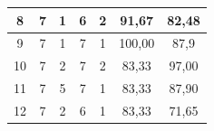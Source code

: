 \begin{table}[H]
\begin{tabular}{|ccccc|c|c|}
		\multicolumn{1}{|c|}{8}                                 & \multicolumn{1}{c|}{7}                                                                          & \multicolumn{1}{c|}{1}                                                                          & \multicolumn{1}{c|}{6}                                                                          & 2                                                  & 91,67                                                & 82,48                                                     \\ \hline
		\multicolumn{1}{|c|}{9}                                 & \multicolumn{1}{c|}{7}                                                                          & \multicolumn{1}{c|}{1}                                                                          & \multicolumn{1}{c|}{7}                                                                          & 1                                                  & 100,00                                               & 87,9                                                      \\ \hline
		\multicolumn{1}{|c|}{10}                                & \multicolumn{1}{c|}{7}                                                                          & \multicolumn{1}{c|}{2}                                                                          & \multicolumn{1}{c|}{7}                                                                          & 2                                                  & 83,33                                                & 97,00                                                     \\ \hline
		\multicolumn{1}{|c|}{11}                                & \multicolumn{1}{c|}{7}                                                                          & \multicolumn{1}{c|}{5}                                                                          & \multicolumn{1}{c|}{7}                                                                          & 1                                                  & 83,33                                                & 87,90                                                     \\ \hline
		\multicolumn{1}{|c|}{12}                                & \multicolumn{1}{c|}{7}                                                                          & \multicolumn{1}{c|}{2}                                                                          & \multicolumn{1}{c|}{6}                                                                          & 1                                                  & 83,33                                                & 71,65                                                     \\ \hline

\end{tabular}
\end{table}
